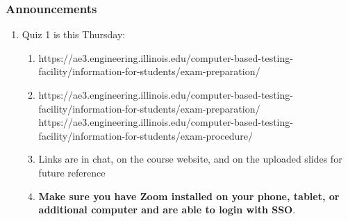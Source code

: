 \documentclass{beamer}
\begin{document}
\begin{frame}
  \frametitle{Announcements}
  \begin{enumerate}
    \item Quiz 1 is this Thursday:
      \begin{enumerate}
        \item https://ae3.engineering.illinois.edu/computer-based-testing-facility/information-for-students/exam-preparation/
        \item https://ae3.engineering.illinois.edu/computer-based-testing-facility/information-for-students/exam-preparation/
          https://ae3.engineering.illinois.edu/computer-based-testing-facility/information-for-students/exam-procedure/ 
        \item Links are in chat, on the course website, and on the uploaded slides for future reference
        \item \textbf{Make sure you have Zoom installed on your phone, tablet, or additional computer and are able to login with SSO}.
      \end{enumerate}
  \end{enumerate}
\end{frame}
\end{document}
